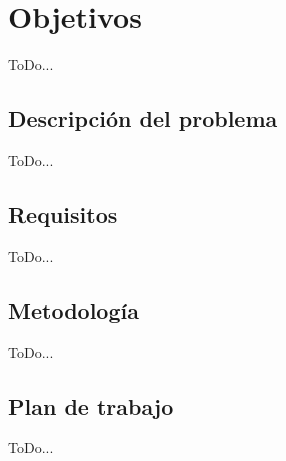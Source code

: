 \chapter{Objetivos}
\label{cap:capitulo2}

ToDo...

\section{Descripción del problema}
\label{sec:descripcion_problema}

ToDo...

\section{Requisitos}
\label{sec:requisitos}

ToDo...

\section{Metodología}
\label{sec:metodologia}

ToDo...

\section{Plan de trabajo}
\label{sec:plantrabajo}

ToDo...